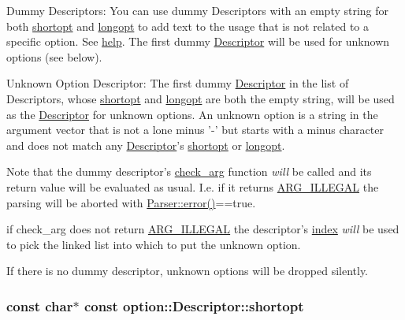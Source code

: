 \begin{DoxyParagraph}{\-Dummy \-Descriptors\-:}
\-You can use dummy \-Descriptors with an empty string for both \hyperlink{structoption_1_1_descriptor_a0dba4ccca59c19d6ed4081391fca5adb}{shortopt} and \hyperlink{structoption_1_1_descriptor_a470c449dfa894c9bfda2dae026142b4b}{longopt} to add text to the usage that is not related to a specific option. \-See \hyperlink{structoption_1_1_descriptor_a9045b19311533e1b8a08645d57149c79}{help}. \-The first dummy \hyperlink{structoption_1_1_descriptor}{\-Descriptor} will be used for unknown options (see below).
\end{DoxyParagraph}
\begin{DoxyParagraph}{\-Unknown \-Option \-Descriptor\-:}
\-The first dummy \hyperlink{structoption_1_1_descriptor}{\-Descriptor} in the list of \-Descriptors, whose \hyperlink{structoption_1_1_descriptor_a0dba4ccca59c19d6ed4081391fca5adb}{shortopt} and \hyperlink{structoption_1_1_descriptor_a470c449dfa894c9bfda2dae026142b4b}{longopt} are both the empty string, will be used as the \hyperlink{structoption_1_1_descriptor}{\-Descriptor} for unknown options. \-An unknown option is a string in the argument vector that is not a lone minus {\ttfamily '-\/'} but starts with a minus character and does not match any \hyperlink{structoption_1_1_descriptor}{\-Descriptor}'s \hyperlink{structoption_1_1_descriptor_a0dba4ccca59c19d6ed4081391fca5adb}{shortopt} or \hyperlink{structoption_1_1_descriptor_a470c449dfa894c9bfda2dae026142b4b}{longopt}. \par
 \-Note that the dummy descriptor's \hyperlink{structoption_1_1_descriptor_aa5d675dba0214a4abd73007ff163cc67}{check\-\_\-arg} function {\itshape will\/} be called and its return value will be evaluated as usual. \-I.\-e. if it returns \hyperlink{namespaceoption_aee8c76a07877335762631491e7a5a1a9a9528e32563b795bd2930b12d0a5e382d}{\-A\-R\-G\-\_\-\-I\-L\-L\-E\-G\-A\-L} the parsing will be aborted with {\ttfamily \hyperlink{classoption_1_1_parser_a2caa149140067b4d13e4d7a104bb3090}{\-Parser\-::error()}==true}. \par
 if {\ttfamily check\-\_\-arg} does not return \hyperlink{namespaceoption_aee8c76a07877335762631491e7a5a1a9a9528e32563b795bd2930b12d0a5e382d}{\-A\-R\-G\-\_\-\-I\-L\-L\-E\-G\-A\-L} the descriptor's \hyperlink{structoption_1_1_descriptor_a1fee8ac44f529c99ac2b1149b4c391b1}{index} {\itshape will\/} be used to pick the linked list into which to put the unknown option. \par
 \-If there is no dummy descriptor, unknown options will be dropped silently. 
\end{DoxyParagraph}
\hypertarget{structoption_1_1_descriptor_a0dba4ccca59c19d6ed4081391fca5adb}{
\subsubsection[{shortopt}]{\setlength{\rightskip}{0pt plus 5cm}const char$\ast$ const {\bf option\-::\-Descriptor\-::shortopt}}}\label{structoption_1_1_descriptor_a0dba4ccca59c19d6ed4081391fca5adb}


